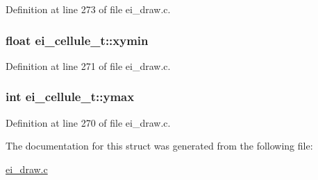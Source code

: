 Definition at line 273 of file ei\-\_\-draw.\-c.

\hypertarget{structei__cellule__t_a761ea1a88e22989260c847ce0a123fb6}{
\subsubsection[{xymin}]{\setlength{\rightskip}{0pt plus 5cm}float ei\-\_\-cellule\-\_\-t\-::xymin}}\label{structei__cellule__t_a761ea1a88e22989260c847ce0a123fb6}


Definition at line 271 of file ei\-\_\-draw.\-c.

\hypertarget{structei__cellule__t_ac8f000cde6f76158c7360bcac0345ba3}{
\subsubsection[{ymax}]{\setlength{\rightskip}{0pt plus 5cm}int ei\-\_\-cellule\-\_\-t\-::ymax}}\label{structei__cellule__t_ac8f000cde6f76158c7360bcac0345ba3}


Definition at line 270 of file ei\-\_\-draw.\-c.



The documentation for this struct was generated from the following file\-:\begin{DoxyCompactItemize}
\item 
\hyperlink{ei__draw_8c}{ei\-\_\-draw.\-c}\end{DoxyCompactItemize}
